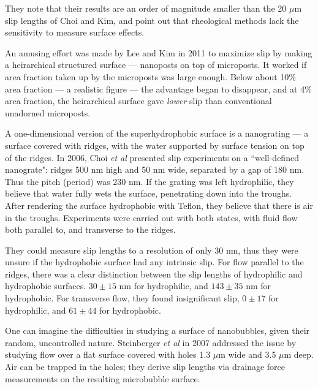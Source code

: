 \documentclass[12pt, a4paper, twoside, openright]{book}
\begin{document}
They note that their results are an order of magnitude smaller than the 20 $\mu$m slip lengths of Choi and Kim, and point out that rheological methods lack the sensitivity to measure surface effects.

An amusing effort was made by Lee and Kim in 2011 \cite{LeeKim2011} to maximize slip by making a heirarchical structured surface --- nanoposts on top of microposts.  It worked if area fraction taken up by the microposts was large enough.  Below about 10\% area fraction --- a realistic figure --- the advantage began to disappear, and at 4\% area fraction, the heirarchical surface gave \emph{lower} slip than conventional unadorned microposts.

\vspace*{1em}

A one-dimensional version of the superhydrophobic surface is a nanograting --- a surface covered with ridges, with the water supported by surface tension on top of the ridges.  In 2006, Choi \emph{et al} \cite{Choi2006} presented slip experiments on a ``well-defined nanograte": ridges 500 nm high and 50 nm wide, separated by a gap of 180 nm.  Thus the pitch (period) was 230 nm.
If the grating was left hydrophilic, they believe that water fully wets the surface, penetrating down into the troughs.  After rendering the surface hydrophobic with Teflon, they believe that there is air in the troughs.  Experiments were carried out with both states, with fluid flow both parallel to, and transverse to the ridges.

They could measure slip lengths to a resolution of only 30 nm, thus they were unsure if the hydrophobic surface had any intrinsic slip.  For flow parallel to the ridges, there was a clear distinction between the slip lengths of hydrophilic and hydrophobic surfaces.  $30 \pm 15$ nm for hydrophilic, and $143 \pm 35$ nm for hydrophobic.  For transverse flow, they found insignificant slip, $0 \pm 17$ for hydrophilic, and $61 \pm 44$ for hydrophobic.

\vspace*{1em}

One can imagine the difficulties in studying a surface of nanobubbles, given their random, uncontrolled nature.  Steinberger \emph{et al} in 2007 \cite{Steinberger2007} addressed the issue by studying flow over a flat surface covered with holes 1.3 $\mu$m wide and 3.5 $\mu$m deep.  Air can be trapped in the holes; they derive slip lengths via drainage force measurements on the resulting microbubble surface.
\end{document}
